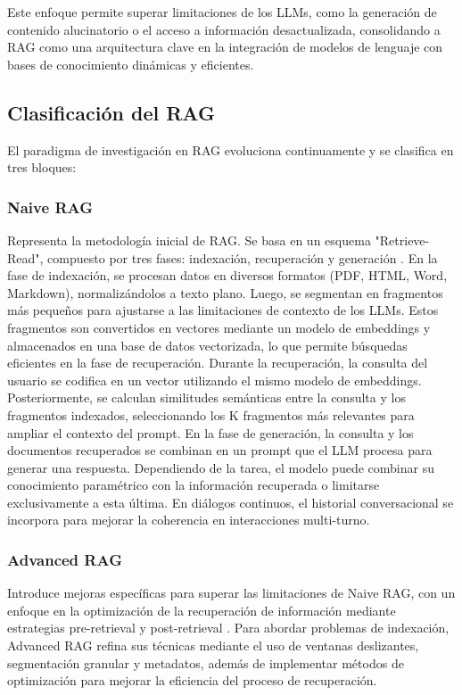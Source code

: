 Este enfoque permite superar limitaciones de los LLMs, como la generación de contenido alucinatorio o el acceso a información desactualizada, consolidando a RAG como una arquitectura clave en la integración de modelos de lenguaje con bases de conocimiento dinámicas y eficientes.

\subsection{Clasificación del RAG}

El paradigma de investigación en RAG evoluciona continuamente y se clasifica en tres bloques:
\subsubsection{Naive RAG}
Representa la metodología inicial de RAG. Se basa en un esquema "Retrieve-Read", compuesto por tres fases: indexación, recuperación y generación \cite{ma2023queryrewritingretrievalaugmentedlarge}.
En la fase de indexación, se procesan datos en diversos formatos (PDF, HTML, Word, Markdown), normalizándolos a texto plano. 
Luego, se segmentan en fragmentos más pequeños para ajustarse a las limitaciones de contexto de los LLMs. 
Estos fragmentos son convertidos en vectores mediante un modelo de embeddings y almacenados en una base de datos vectorizada, lo que permite búsquedas eficientes en la fase de recuperación.
Durante la recuperación, la consulta del usuario se codifica en un vector utilizando el mismo modelo de embeddings. 
Posteriormente, se calculan similitudes semánticas entre la consulta y los fragmentos indexados, seleccionando los K fragmentos más relevantes para ampliar el contexto del prompt.
En la fase de generación, la consulta y los documentos recuperados se combinan en un prompt que el LLM procesa para generar una respuesta. 
Dependiendo de la tarea, el modelo puede combinar su conocimiento paramétrico con la información recuperada o limitarse exclusivamente a esta última. 
En diálogos continuos, el historial conversacional se incorpora para mejorar la coherencia en interacciones multi-turno.

\subsubsection{Advanced RAG}
Introduce mejoras específicas para superar las limitaciones de Naive RAG, con un enfoque en la optimización de la recuperación de información mediante estrategias pre-retrieval y post-retrieval \cite{ilin2023advanced}. 
Para abordar problemas de indexación, Advanced RAG refina sus técnicas mediante el uso de ventanas deslizantes, segmentación granular y metadatos, además de implementar métodos de optimización para mejorar la eficiencia del proceso de recuperación.

